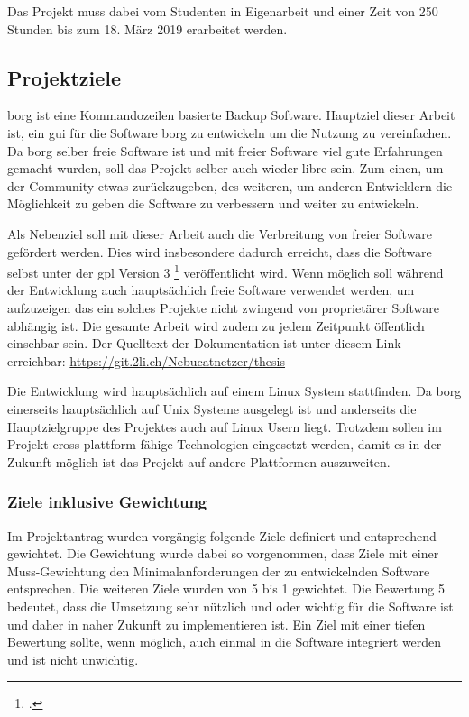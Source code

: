 Das Projekt muss dabei vom Studenten in Eigenarbeit und einer Zeit von 250
Stunden bis zum 18. März 2019 erarbeitet werden.

\subsection{Projektziele}
\label{sec:org3d20026}

\gls{borg} ist eine Kommandozeilen basierte Backup Software. Hauptziel dieser
Arbeit ist, ein \gls{gui} für die Software \gls{borg} zu entwickeln um die Nutzung
zu vereinfachen. Da \gls{borg} selber freie Software ist und mit freier Software
viel gute Erfahrungen gemacht wurden, soll das Projekt selber auch wieder
\gls{libre} sein. Zum einen, um der Community etwas zurückzugeben, des weiteren,
um anderen Entwicklern die Möglichkeit zu geben die Software zu verbessern und
weiter zu entwickeln.

Als Nebenziel soll mit dieser Arbeit auch die Verbreitung von freier
Software gefördert werden. Dies wird insbesondere dadurch erreicht, dass die
Software selbst unter der \gls{gpl} Version 3 \footcite{gplv3} veröffentlicht wird.
Wenn möglich soll während der Entwicklung auch hauptsächlich freie Software
verwendet werden, um aufzuzeigen das ein solches Projekte nicht zwingend von
proprietärer Software abhängig ist. Die gesamte Arbeit wird zudem zu jedem
Zeitpunkt öffentlich einsehbar sein. Der Quelltext der Dokumentation ist unter
diesem Link erreichbar: \url{https://git.2li.ch/Nebucatnetzer/thesis}

Die Entwicklung wird hauptsächlich auf einem Linux System stattfinden. Da
\gls{borg} einerseits hauptsächlich auf Unix Systeme ausgelegt ist und anderseits
die Hauptzielgruppe des Projektes auch auf Linux Usern liegt. Trotzdem sollen
im Projekt cross-plattform fähige Technologien eingesetzt werden, damit es in
der Zukunft möglich ist das Projekt auf andere Plattformen auszuweiten.

\subsubsection{Ziele inklusive Gewichtung}
\label{sec:org2ef9c2b}

Im Projektantrag wurden vorgängig folgende Ziele definiert und entsprechend
gewichtet. Die Gewichtung wurde dabei so vorgenommen, dass Ziele mit einer
Muss-Gewichtung den Minimalanforderungen der zu entwickelnden Software
entsprechen. Die weiteren Ziele wurden von 5 bis 1 gewichtet. Die Bewertung 5
bedeutet, dass die Umsetzung sehr nützlich und oder wichtig für die Software
ist und daher in naher Zukunft zu implementieren ist. Ein Ziel mit einer tiefen
Bewertung sollte, wenn möglich, auch einmal in die Software integriert werden
und ist nicht unwichtig.

